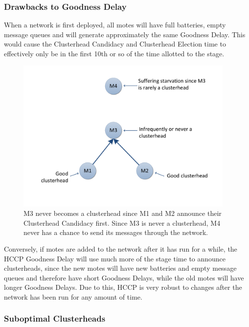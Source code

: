      
 \subsubsection{Drawbacks to Goodness Delay}
     When a network is first deployed, all motes will have full batteries, empty message queues and 
     will generate approximately the same Goodness Delay.
     This would cause the Clusterhead Candidacy and Clusterhead Election time to effectively only be in the first 10th or so of the 
     time allotted to the stage.
     
     \begin{figure}[t]
      	\centering
      		\includegraphics[height=3in]{images/HCCPBlocking/hiddenNode/BetterHiddenNode.pdf}
      	\caption{M3 never becomes a clusterhead since M1 and M2 announce their Clusterhead Candidacy first. Since M3 is never a clusterhead, M4 never has a chance to send its messages through the network.}
      	\label{fig:images_HCCPBlocking_hiddenNode_HiddenNode}
      \end{figure}
     
     
     Conversely, if motes are added to the network after it has run for a while, the HCCP Goodness Delay
     will use much more of the stage time to announce clusterheads, since the new motes will have new batteries and
     empty message queues and therefore have short Goodness Delays, while the old motes will have longer
     Goodness Delays. Due to this, HCCP is very robust to changes after the network has been run for any amount of time.



     
\subsubsection{Suboptimal Clusterheads}
\label{hccp_blocking}

